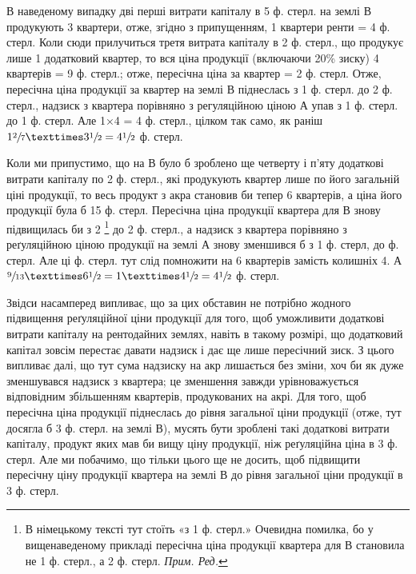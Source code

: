 В наведеному випадку дві перші витрати капіталу в 5 ф. стерл. на землі В
продукують 3 квартери, отже, згідно з припущенням, 1 квартери ренти =
4 ф. стерл. Коли сюди прилучиться третя витрата капіталу в
2 ф. стерл.,
що продукує лише 1 додатковий квартер, то вся ціна продукції (включаючи 20\%
зиску) 4 квартерів = 9 ф. стерл.; отже, пересічна ціна за квартер = 2 ф. стерл.
Отже, пересічна ціна продукції за квартер на землі В піднеслась з 1 ф. стерл.
до 2 ф. стерл., надзиск з квартера порівняно з регуляційною ціною А упав
з 1 ф. стерл. до 1 ф. стерл. Але 1×4 = 4 ф. стерл., цілком так само,
як раніш $1\sfrac{2}{7} × 3\sfrac{1}{2} = 4\sfrac{1}{2}$ ф. стерл.

Коли ми припустимо, що на В було б зроблено ще четверту і п’яту додаткові
витрати капіталу по 2   ф. стерл., які продукують квартер лише по його
загальній ціні продукції, то весь продукт з акра становив би тепер 6 квартерів,
а ціна його продукції була б 15 ф. стерл. Пересічна ціна продукції
квартера для В знову підвищилась би з 2
\footnote*{В німецькому тексті тут стоїть «з 1 ф. стерл.» Очевидна помилка,
бо у вищенаведеному прикладі пересічна ціна продукції квартера для В
становила не 1 ф. стерл., а 2 ф. стерл. \emph{Прим. Ред.}}
до 2 ф. стерл., а надзиск з квартера
порівняно з реґуляційною ціною продукції на землі А знову зменшився
б з 1 ф. стерл, до  ф. стерл. Але ці  ф. стерл. тут слід
помножити на 6 квартерів замість колишніх 4.
А $\sfrac{9}{13}×6 \sfrac{1}{2} = 1× 4 \sfrac{1}{2} = 4 \sfrac{1}{2}$ ф. стерл.

Звідси насамперед випливає, що за цих обставин не потрібно жодного підвищення
реґуляційної ціни продукції для того, щоб уможливити додаткові витрати
капіталу на рентодайних землях, навіть в такому розмірі, що додатковий
капітал зовсім перестає давати надзиск і дає ще лише пересічний зиск. З
цього випливає далі, що тут сума надзиску на акр лишається без зміни,
хоч би як дуже зменшувався надзиск з квартера; це зменшення завжди урівноважується
відповідним збільшенням квартерів, продукованих на акрі. Для того,
щоб пересічна ціна продукції піднеслась до рівня загальної ціни продукції (отже,
тут досягла б 3 ф. стерл. на землі В), мусять бути зроблені такі додаткові витрати
капіталу, продукт яких мав би вищу ціну продукції, ніж реґуляційна ціна
в 3 ф. стерл. Але ми побачимо, що тільки цього ще не досить, щоб підвищити
пересічну ціну продукції квартера на землі В до рівня загальної ціни продукції
в 3 ф. стерл.

